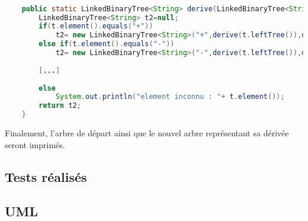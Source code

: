 \documentclass[a4paper]{article}
\begin{document}
\begin{lstlisting}[language=Java]

	public static LinkedBinaryTree<String> derive(LinkedBinaryTree<String> t){
		LinkedBinaryTree<String> t2=null;		
		if(t.element().equals("+"))
			t2= new LinkedBinaryTree<String>("+",derive(t.leftTree()),derive(t.rightTree()));			
		else if(t.element().equals("-"))
			t2= new LinkedBinaryTree<String>("-",derive(t.leftTree()),derive(t.rightTree()));
		
		[...]
		
		else
			System.out.println("element inconnu : "+ t.element());		
		return t2;	
	}
\end{lstlisting}


Finalement, l'arbre de départ ainsi que le nouvel arbre représentant sa dérivée seront imprimés.	

\subsection*{Tests réalisés}

\subsection*{UML}
\end{document}
